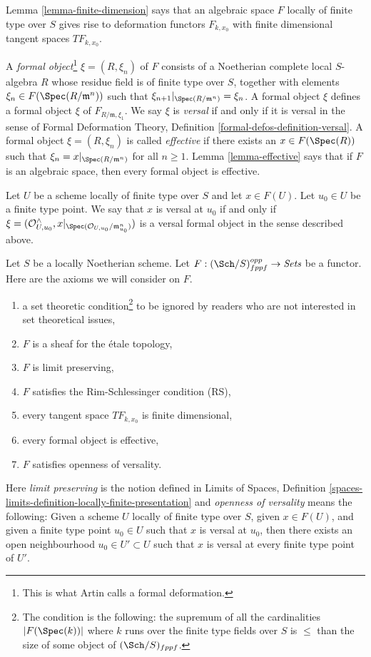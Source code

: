\medskip\noindent
Lemma \ref{lemma-finite-dimension} says that an algebraic space $F$
locally of finite type over $S$ gives rise to deformation functors
$F_{k, x_0}$ with finite dimensional tangent spaces $TF_{k, x_0}$.

\medskip\noindent
A {\it formal object}\footnote{This is what Artin calls a formal deformation.}
$\xi = (R, \xi_n)$ of $F$ consists of a Noetherian
complete local $S$-algebra $R$ whose residue field is of finite type
over $S$, together with elements $\xi_n \in F(\Spec(R/\mathfrak m^n))$
such that $\xi_{n + 1}|_{\Spec(R/\mathfrak m^n)} = \xi_n$. A formal
object $\xi$ defines a formal object $\xi$ of $F_{R/\mathfrak m, \xi_1}$.
We say $\xi$ is {\it versal} if and only if it is versal in the sense of
Formal Deformation Theory, Definition \ref{formal-defos-definition-versal}.
A formal object $\xi = (R, \xi_n)$ is called {\it effective}
if there exists an $x \in F(\Spec(R))$ such that
$\xi_n = x|_{\Spec(R/\mathfrak m^n)}$ for all $n \geq 1$.
Lemma \ref{lemma-effective} says that if $F$ is an algebraic space,
then every formal object is effective.

\medskip\noindent
Let $U$ be a scheme locally of finite type over $S$ and let $x \in F(U)$.
Let $u_0 \in U$ be a finite type point. We say that $x$ is versal at $u_0$
if and only if
$\xi = (\mathcal{O}_{U, u_0}^\wedge,
x|_{\Spec(\mathcal{O}_{U, u_0}/\mathfrak m_{u_0}^n)})$
is a versal formal object in the sense described above.

\medskip\noindent
Let $S$ be a locally Noetherian scheme. Let
$F : (\Sch/S)_{fppf}^{opp} \to \textit{Sets}$ be a functor.
Here are the axioms we will consider on $F$.
\begin{enumerate}
\item[{[-1]}]  a set theoretic condition\footnote{The condition is the
following: the supremum of all the cardinalities
$|F(\Spec(k))|$ where $k$ runs over the finite
type fields over $S$ is $\leq$ than the size of some
object of $(\Sch/S)_{fppf}$.} to be ignored by
readers who are not interested in set theoretical issues,
\item[{[0]}] $F$ is a sheaf for the \'etale topology,
\item[{[1]}] $F$ is limit preserving,
\item[{[2]}] $F$ satisfies the Rim-Schlessinger condition (RS),
\item[{[3]}] every tangent space $TF_{k, x_0}$ is finite dimensional,
\item[{[4]}] every formal object is effective,
\item[{[5]}] $F$ satisfies openness of versality.
\end{enumerate}
Here {\it limit preserving} is the notion defined in
Limits of Spaces, Definition
\ref{spaces-limits-definition-locally-finite-presentation} and
{\it openness of versality} means the following: Given a scheme $U$
locally of finite type over $S$, given $x \in F(U)$, and given
a finite type point $u_0 \in U$ such that $x$ is versal at $u_0$,
then there exists an open neighbourhood $u_0 \in U' \subset U$
such that $x$ is versal at every finite type point of $U'$.






